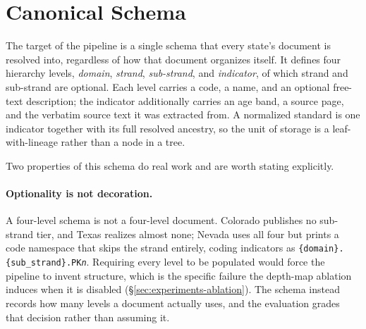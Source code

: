 \section{Canonical Schema}
\label{sec:schema}

The target of the pipeline is a single schema that every state's document is
resolved into, regardless of how that document organizes itself. It defines
four hierarchy levels, \emph{domain}, \emph{strand}, \emph{sub-strand}, and
\emph{indicator}, of which strand and sub-strand are optional. Each level
carries a code, a name, and an optional free-text description; the indicator
additionally carries an age band, a source page, and the verbatim source text
it was extracted from. A normalized standard is one indicator together with its
full resolved ancestry, so the unit of storage is a leaf-with-lineage rather
than a node in a tree.

Two properties of this schema do real work and are worth stating explicitly.

\paragraph{Optionality is not decoration.} A four-level schema is not a
four-level document. Colorado publishes no sub-strand tier, and Texas realizes
almost none; Nevada uses all four but prints a code namespace that skips the
strand entirely, coding indicators as
\texttt{\{domain\}.\{sub\_strand\}.PK\emph{n}}. Requiring every level to be
populated would force the pipeline to invent structure, which is the specific
failure the depth-map ablation induces when it is disabled
(\S\ref{sec:experiments-ablation}). The schema instead records how many levels a
document actually uses, and the evaluation grades that decision rather than
assuming it.

